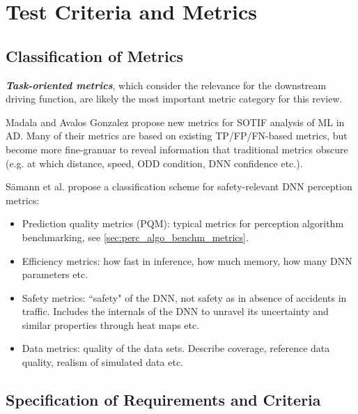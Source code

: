 \documentclass[conference]{IEEEtran}
\newcommand{\new}[1]{{\color{my-red}#1}}
\begin{document}
%
%




\section{Test Criteria and Metrics}
\label{sec:axis_criteria_metrics}

\subsection{\new{Classification of Metrics}}
\textit{\textbf{Task-oriented metrics}}, which consider the relevance for the downstream driving function, are likely the most important metric category for this review. 

Madala and Avalos Gonzalez \cite{Madala2023metrics} propose new metrics for SOTIF analysis of ML in AD. Many of their metrics are based on existing TP/FP/FN-based metrics, but become more fine-granuar to reveal information that traditional metrics obscure (e.g. at which distance, speed, ODD condition, DNN confidence etc.).


Sämann et al. \cite{Saemann2020strategy} propose a classification scheme for safety-relevant DNN perception metrics: 
\begin{itemize}
\item Prediction quality metrics (PQM): typical metrics for perception algorithm benchmarking, see \ref{sec:perc_algo_benchm_metrics}.
\item Efficiency metrics: how fast in inference, how much memory, how many DNN parameters etc.
\item Safety metrics: ``safety" of the DNN, not safety as in absence of accidents in traffic. Includes the internals of the DNN to unravel its uncertainty and similar properties through heat maps etc.
\item Data metrics: quality of the data sets. Describe coverage, reference data quality, realism of simulated data etc. 
\end{itemize}



\subsection{Specification of Requirements and Criteria}
\label{sec:requirements}
\end{document}
